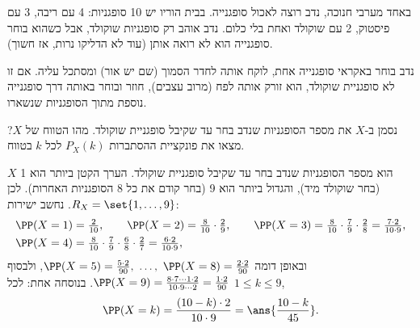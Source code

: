 באחד מערבי חנוכה, נדב רוצה לאכול סופגנייה. בבית הוריו יש 10 סופגניות: 4 עם ריבה, 3 עם פיסטוק, 2 עם שוקולד ואחת בלי כלום. נדב אוהב רק סופגניות שוקולד, אבל כשהוא בוחר סופגנייה הוא לא רואה אותן (עוד לא הדליקו נרות, אז חשוך).

נדב בוחר באקראי סופגנייה אחת, לוקח אותה לחדר הסמוך (שם יש אור) ומסתכל עליה. אם זו לא סופגניית שוקולד, הוא זורק אותה לפח (מרוב עצבים), חוזר ובוחר באותה דרך סופגנייה נוספת מתוך הסופגניות שנשארו.

נסמן ב-$X$ את מספר הסופגניות שנדב בחר עד שקיבל סופגניית שוקולד. מהו הטווח של $X$? מצאו את פונקציית ההסתברות $P_X(k)$ לכל $k$ בטווח.
\begin{solbox}
\unverified
$X$ הוא מספר הסופגניות שנדב בחר עד שקיבל סופגניית שוקולד. הערך הקטן ביותר הוא 1 (בחר שוקולד מיד), והגדול ביותר הוא 9 (בחר קודם את כל 8 הסופגניות האחרות). לכן $R_X=\set{1,\dots,9}$. נחשב ישירות:
\[
\begin{aligned}
\PP(X=1)&=\tfrac2{10},\qquad
\PP(X=2)=\tfrac8{10}\cdot\tfrac29,\qquad
\PP(X=3)=\tfrac8{10}\cdot\tfrac79\cdot\tfrac28=\tfrac{7\cdot2}{10\cdot9},\\
\PP(X=4)&=\tfrac8{10}\cdot\tfrac79\cdot\tfrac68\cdot\tfrac27=\tfrac{6\cdot2}{10\cdot9},
\end{aligned}
\]
ובאופן דומה $\PP(X=5)=\frac{5\cdot2}{90},\ \dots,\ \PP(X=8)=\frac{2\cdot2}{90}$, ולבסוף
$\PP(X=9)=\frac{8\cdot7\cdots1\cdot2}{10\cdot9\cdots2}=\frac{1\cdot2}{90}$. בנוסחה אחת: לכל $1\le k\le9$,
\[
\PP(X=k)=\frac{(10-k)\cdot2}{10\cdot9}=\ans{\frac{10-k}{45}}.
\]
\end{solbox}
